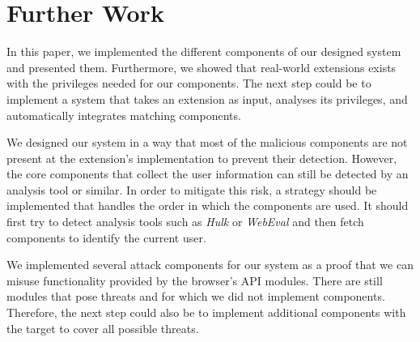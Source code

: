 
\chapter{Further Work}
\label{chp:furhterWork}

	In this paper, we implemented the different components of our designed system and presented them. Furthermore, we showed that real-world extensions exists with the privileges needed for our components. The next step could be to implement a system that takes an extension as input, analyses its privileges, and automatically integrates matching components. 

	We designed our system in a way that most of the malicious components are not present at the extension's implementation to prevent their detection. However, the core components that collect the user information can still be detected by an analysis tool or similar. In order to mitigate this risk, a strategy should be implemented that handles the order in which the components are used. It should first try to detect analysis tools such as \textit{Hulk}\cite{184485} or \textit{WebEval}\cite{190984} and then fetch components to identify the current user.
	
	We implemented several attack components for our system as a proof that we can misuse functionality provided by the browser's API modules. There are still modules that pose threats and for which we did not implement components. Therefore, the next step could also be to implement additional components with the target to cover all possible threats. 